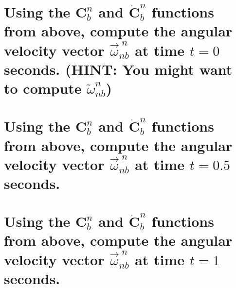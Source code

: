 \documentclass[12pt,letterpaper, onecolumn]{exam}
\begin{document}
\begin{questions}
\begin{parts}
        \part{Using the $\mathbf{C}^n_b$ and $\dot{\mathbf{C}}^n_b$ functions from above, compute the angular velocity vector $\vec{\omega}^{\;n}_{nb}$ at time $t = 0$ seconds. (HINT: You might want to compute $\tilde{\omega}^{n}_{nb}$)}
        \begin{subparts}

        \end{subparts}

        \part{Using the $\mathbf{C}^n_b$ and $\dot{\mathbf{C}}^n_b$ functions from above, compute the angular velocity vector $\vec{\omega}^{\;n}_{nb}$ at time $t = 0.5$ seconds.}
        \begin{subparts}

        \end{subparts}
        \part{Using the $\mathbf{C}^n_b$ and $\dot{\mathbf{C}}^n_b$ functions from above, compute the angular velocity vector $\vec{\omega}^{\;n}_{nb}$ at time $t = 1$ seconds.}
        \begin{subparts}

        \end{subparts}


\end{parts}
\end{questions}
\end{document}
